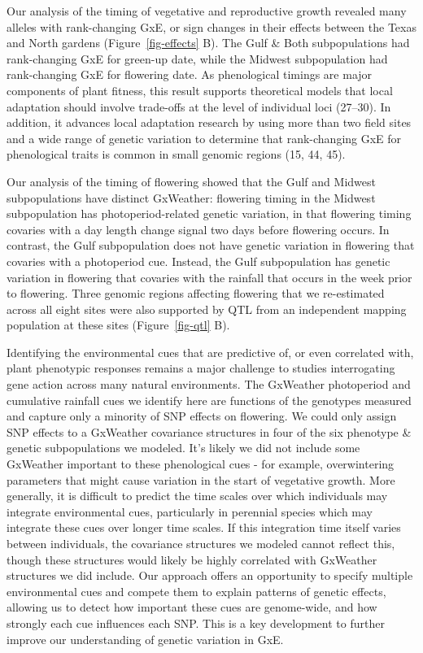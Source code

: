 \documentclass[
  9pt,
  twocolumn,
  twoside]{pnas-new}
\begin{document}
Our analysis of the timing of vegetative and reproductive growth
revealed many alleles with rank-changing GxE, or sign changes in their
effects between the Texas and North gardens (Figure~\ref{fig-effects}
B). The Gulf \& Both subpopulations had rank-changing GxE for green-up
date, while the Midwest subpopulation had rank-changing GxE for
flowering date. As phenological timings are major components of plant
fitness, this result supports theoretical models that local adaptation
should involve trade-offs at the level of individual loci (27--30). In
addition, it advances local adaptation research by using more than two
field sites and a wide range of genetic variation to determine that
rank-changing GxE for phenological traits is common in small genomic
regions (15, 44, 45).

Our analysis of the timing of flowering showed that the Gulf and Midwest
subpopulations have distinct GxWeather: flowering timing in the Midwest
subpopulation has photoperiod-related genetic variation, in that
flowering timing covaries with a day length change signal two days
before flowering occurs. In contrast, the Gulf subpopulation does not
have genetic variation in flowering that covaries with a photoperiod
cue. Instead, the Gulf subpopulation has genetic variation in flowering
that covaries with the rainfall that occurs in the week prior to
flowering. Three genomic regions affecting flowering that we
re-estimated across all eight sites were also supported by QTL from an
independent mapping population at these sites (Figure~\ref{fig-qtl} B).

Identifying the environmental cues that are predictive of, or even
correlated with, plant phenotypic responses remains a major challenge to
studies interrogating gene action across many natural environments. The
GxWeather photoperiod and cumulative rainfall cues we identify here are
functions of the genotypes measured and capture only a minority of SNP
effects on flowering. We could only assign SNP effects to a GxWeather
covariance structures in four of the six phenotype \& genetic
subpopulations we modeled. It's likely we did not include some GxWeather
important to these phenological cues - for example, overwintering
parameters that might cause variation in the start of vegetative growth.
More generally, it is difficult to predict the time scales over which
individuals may integrate environmental cues, particularly in perennial
species which may integrate these cues over longer time scales. If this
integration time itself varies between individuals, the covariance
structures we modeled cannot reflect this, though these structures would
likely be highly correlated with GxWeather structures we did include.
Our approach offers an opportunity to specify multiple environmental
cues and compete them to explain patterns of genetic effects, allowing
us to detect how important these cues are genome-wide, and how strongly
each cue influences each SNP. This is a key development to further
improve our understanding of genetic variation in GxE.
\end{document}
